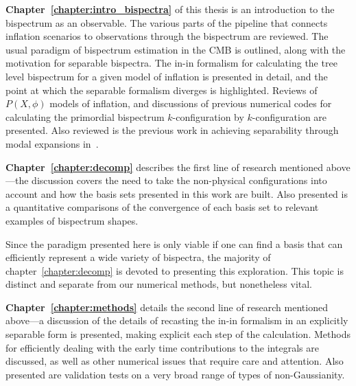 \textbf{Chapter~\ref{chapter:intro_bispectra}} of this thesis
is an introduction to the bispectrum as an observable.
The various parts of the pipeline that connects inflation scenarios to observations
through the bispectrum are reviewed.
The usual paradigm of bispectrum estimation in the CMB is outlined,
along with the motivation for separable bispectra. The in-in formalism
for calculating the tree level bispectrum for a given model of inflation
is presented in detail, and the point at which the separable formalism diverges is
highlighted.
Reviews of $P(X,\phi)$ models of inflation, and
discussions of previous numerical codes for
calculating the primordial bispectrum $k$-configuration by $k$-configuration
are presented.
Also reviewed is the previous work in achieving separability through modal expansions
in~\cite{Funakoshi}.



\textbf{Chapter~\ref{chapter:decomp}} describes the first line of research mentioned above---the
discussion covers the need to
take the non-physical configurations into account and how the basis sets
presented in this work are built.
Also presented is a quantitative comparisons of the convergence of each basis set to
relevant examples of bispectrum shapes.


Since the paradigm presented here is only viable if one can find a basis
that can efficiently represent a wide variety of bispectra,
the majority of chapter~\ref{chapter:decomp} is devoted to presenting this exploration.
This topic is distinct and separate from our numerical methods, but nonetheless vital.



\textbf{Chapter~\ref{chapter:methods}} details the second line of research mentioned above---a
discussion of the details of recasting the in-in formalism in an explicitly separable form is presented,
making explicit each step of the calculation.
Methods for efficiently dealing with the early time contributions to the integrals are discussed,
as well as other numerical issues that require care and attention.
Also presented are validation tests on a very broad range of types of non-Gaussianity.


